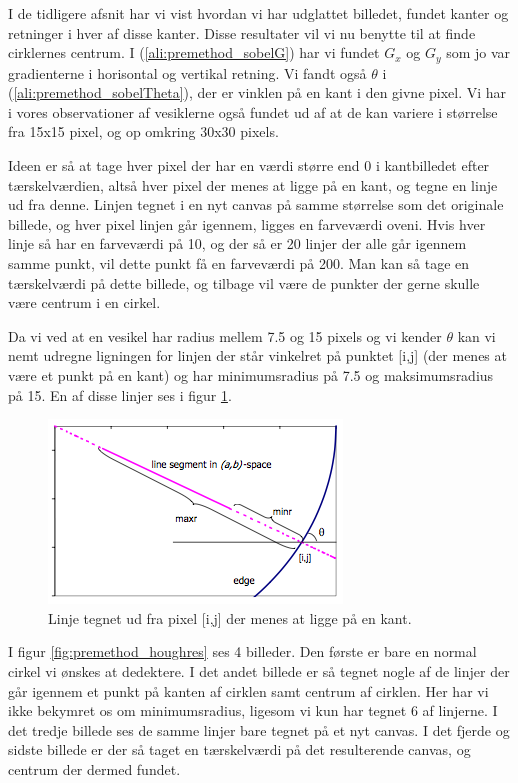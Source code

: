 I de tidligere afsnit har vi vist hvordan vi har udglattet billedet, fundet kanter og retninger i hver af disse kanter. Disse resultater vil vi nu benytte til at finde cirklernes centrum. I (\ref{ali:premethod_sobelG}) har vi fundet $G_x$ og $G_y$ som jo var gradienterne i horisontal og vertikal retning. Vi fandt også $\theta$ i (\ref{ali:premethod_sobelTheta}), der er vinklen på en kant i den givne pixel. Vi har i vores observationer af vesiklerne også fundet ud af at de kan variere i størrelse fra 15x15 pixel, og op omkring 30x30 pixels.

Ideen er så at tage hver pixel der har en værdi større end 0 i kantbilledet efter tærskelværdien, altså hver pixel der menes at ligge på en kant, og tegne en linje ud fra denne. Linjen tegnet i en nyt canvas på samme størrelse som det originale billede, og hver pixel linjen går igennem, ligges en farveværdi oveni. Hvis hver linje så har en farveværdi på 10, og der så er 20 linjer der alle går igennem samme punkt, vil dette punkt få en farveværdi på 200. Man kan så tage en tærskelværdi på dette billede, og tilbage vil være de punkter der gerne skulle være centrum i en cirkel. 

Da vi ved at en vesikel har radius mellem 7.5 og 15 pixels og vi kender $\theta$ kan vi nemt udregne ligningen for linjen der står vinkelret på punktet [i,j] (der menes at være et punkt på en kant) og har minimumsradius på 7.5 og maksimumsradius på 15. En af disse linjer ses i figur \ref{fig:premethod_houghLines}. 

\begin{figure}[H]
	\centering
	\includegraphics[scale=1]{files/premethod/img/hough_lines.png}
	\caption{Linje tegnet ud fra pixel [i,j] der menes at ligge på en kant.\label{fig:premethod_houghLines}}
\end{figure}

I figur \ref{fig:premethod_houghres} ses 4 billeder. Den første er bare en normal cirkel vi ønskes at dedektere. I det andet billede er så tegnet nogle af de linjer der går igennem et punkt på kanten af cirklen samt centrum af cirklen. Her har vi ikke bekymret os om minimumsradius, ligesom vi kun har tegnet 6 af linjerne. I det tredje billede ses de samme linjer bare tegnet på et nyt canvas. I det fjerde og sidste billede er der så taget en tærskelværdi på det resulterende canvas, og centrum der dermed fundet.

